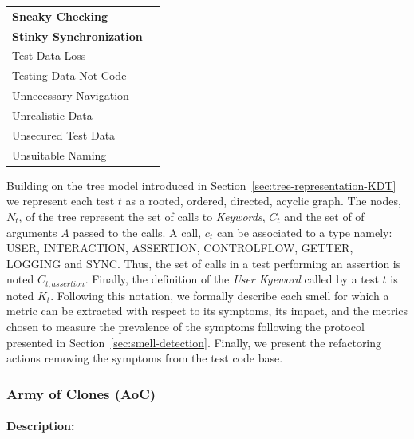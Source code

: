 \begin{table}
\begin{tabular}{>{\raggedright}p{1.5in}>{\raggedright}p{4in}}
\scriptsize{\textbf{Sneaky Checking}} & \scriptsize{\cite{Kirkbride2014, Buwalda2015, Renaudin2016}} \tabularnewline

\scriptsize{\textbf{Stinky Synchronization}} & \scriptsize{\cite{Gawinecki2016, Renaudin2016, Bushnev2019, Jones2019, Sheth2020}} \tabularnewline 

\scriptsize{Test Data Loss} & \scriptsize{\cite{Siminiuc2019}} \tabularnewline

\scriptsize{Testing Data Not Code} & \scriptsize{\cite{Dharmender2017}} \tabularnewline 

\scriptsize{Unnecessary Navigation} & \scriptsize{\cite{Archer2010}} \tabularnewline 

\scriptsize{Unrealistic Data} & \scriptsize{\cite{Goldberg2019}} \tabularnewline 

\scriptsize{Unsecured Test Data} & \scriptsize{\cite{Morlion2019}} \tabularnewline

\scriptsize{Unsuitable Naming} & \scriptsize{\cite{Chen2012, Goldberg2019, Shay2019, Sheth2020}} \tabularnewline

\bottomrule
\end{tabular}

\end{table}

Building on the tree model introduced in Section~\ref{sec:tree-representation-KDT} we represent each test $t$ as a rooted, ordered, directed, acyclic graph. The nodes, $N_t$, of the tree represent the set of calls to \emph{Keywords}, $C_t$ and the set of of arguments $A$ passed to the calls. A call, $c_t$ can be associated to a type namely: USER, INTERACTION, ASSERTION, CONTROLFLOW, GETTER, LOGGING and SYNC. Thus, the set of calls in a test performing an assertion is noted $C_{t, assertion}$. Finally, the definition of the \emph{User Kyeword} called by a test $t$ is noted $K_t$. Following this notation, we formally describe each smell for which a metric can be extracted with respect to its symptoms, its impact, and the metrics chosen to measure the prevalence of the symptoms following the protocol presented in Section~\ref{sec:smell-detection}. Finally, we present the refactoring actions removing the symptoms from the test code base.

\subsubsection{Army of Clones (AoC)}

\paragraph{Description:}

